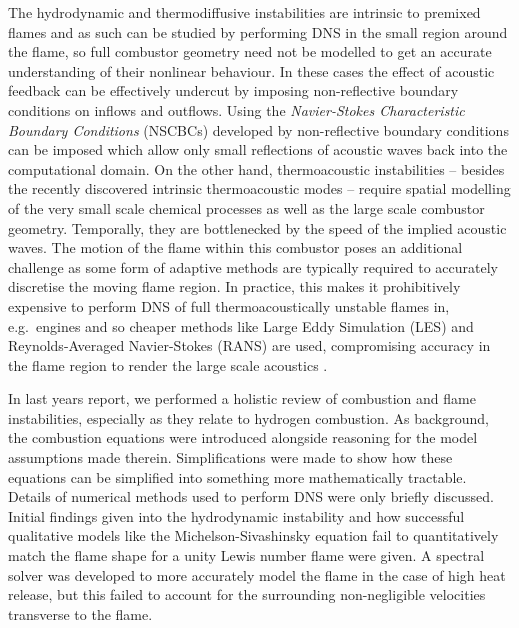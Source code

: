 The hydrodynamic and thermodiffusive instabilities are intrinsic to premixed flames and as such can be studied by performing DNS in the small region around the flame, so full combustor geometry need not be modelled to get an accurate understanding of their nonlinear behaviour. In these cases the effect of acoustic feedback can be effectively undercut by imposing non-reflective boundary conditions on inflows and outflows. Using the \emph{Navier-Stokes Characteristic Boundary Conditions} (NSCBCs) developed by \cite{thompson1990TimeDependentBoundaryConditions, poinsot1992BoundaryConditionsDirect, poinsot2001TheoreticalNumericalCombustion, sutherland2003ImprovedBoundaryConditions} non-reflective boundary conditions can be imposed which allow only small reflections of acoustic waves back into the computational domain. On the other hand, thermoacoustic instabilities -- besides the recently discovered intrinsic thermoacoustic modes \cite{silva2023IntrinsicThermoacousticInstabilities} -- require spatial modelling of the very small scale chemical processes as well as the large scale combustor geometry. Temporally, they are bottlenecked by the speed of the implied acoustic waves. The motion of the flame within this combustor poses an additional challenge as some form of adaptive methods are typically required to accurately discretise the moving flame region. In practice, this makes it prohibitively expensive to perform DNS of full thermoacoustically unstable flames in, e.g.\ engines and so cheaper methods like Large Eddy Simulation (LES) and Reynolds-Averaged Navier-Stokes (RANS) are used, compromising accuracy in the flame region to render the large scale acoustics \cite{yang2015LargeEddySimulationPresent, domingo2023RecentDevelopmentsDNS}.

In last years report, we performed a holistic review of combustion and flame instabilities, especially as they relate to hydrogen combustion. As background, the combustion equations were introduced alongside reasoning for the model assumptions made therein. Simplifications were made to show how these equations can be simplified into something more mathematically tractable. Details of numerical methods used to perform DNS were only briefly discussed. Initial findings given into the hydrodynamic instability and how successful qualitative models like the Michelson-Sivashinsky equation \cite{sivashinsky1977NonlinearAnalysisHydrodynamic, michelson1977NonlinearAnalysisHydrodynamic} fail to quantitatively match the flame shape for a unity Lewis number flame were given. A spectral solver was developed to more accurately model the flame in the case of high heat release, but this failed to account for the surrounding non-negligible velocities transverse to the flame.

